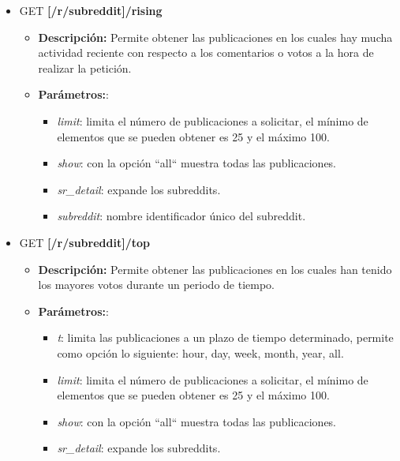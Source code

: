 \documentclass[../../main.tex]{subfiles}
\begin{document}
\begin{itemize}
    
    \item GET \textbf{[/r/subreddit]/rising}
    \begin{itemize}
    \item \textbf{Descripción:} Permite obtener las publicaciones en los cuales hay mucha actividad reciente con respecto a los comentarios o votos a la hora de realizar la petición.
        \item \textbf{Parámetros:}:
        \begin{itemize}
            \item  \textit{limit}: limita el número de publicaciones a solicitar, el mínimo de elementos que se pueden obtener es 25 y el máximo 100.
            
            \item  \textit{show}: con la opción ``all`` muestra todas las publicaciones.
            
            \item  \textit{sr\_detail}: expande los subreddits.
            
            \item  \textit{subreddit}: nombre identificador único del subreddit.
        \end{itemize}
    \end{itemize}
    
    \item GET \textbf{[/r/subreddit]/top}
    \begin{itemize}
    \item \textbf{Descripción:} Permite obtener las publicaciones en los cuales han tenido los mayores votos durante un periodo de tiempo.
        \item \textbf{Parámetros:}:
        \begin{itemize}
            \item  \textit{t}: limita las publicaciones a un plazo de tiempo determinado, permite como opción lo siguiente: hour, day, week, month, year, all.
            
            \item  \textit{limit}: limita el número de publicaciones a solicitar, el mínimo de elementos que se pueden obtener es 25 y el máximo 100.
            
            \item  \textit{show}: con la opción ``all`` muestra todas las publicaciones.
            
            \item  \textit{sr\_detail}: expande los subreddits.
            

\end{itemize}
\end{itemize}
\end{itemize}
\end{document}
